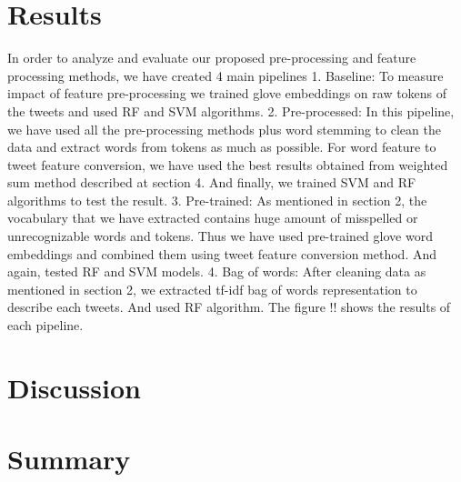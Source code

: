 \documentclass[10pt,conference,compsocconf]{IEEEtran}
\begin{document}



\section{Results}
\label{S4}
In order to analyze and evaluate our proposed pre-processing and feature processing methods, we have created 4 main pipelines
1. Baseline: 
	To measure impact of feature pre-processing we trained glove embeddings on raw tokens of the tweets and used RF and SVM algorithms.
2. Pre-processed:
	In this pipeline, we have used all the pre-processing methods plus word stemming to clean the data and extract words from tokens as much as possible. For word feature to tweet feature conversion, we have used the best results obtained from weighted sum method described at section 4. And finally, we trained SVM and RF algorithms to test the result.
3. Pre-trained:
	As mentioned in section 2, the vocabulary that we have extracted contains huge amount of misspelled or unrecognizable words and tokens. Thus we have used pre-trained glove word embeddings and combined them using tweet feature conversion method. And again, tested RF and SVM models.
4. Bag of words:
	After cleaning data as mentioned in section 2, we extracted tf-idf bag of words representation to describe each tweets. And used RF algorithm.
The figure !! shows the results of each pipeline. 


\section{Discussion}
\label{S5}

\section{Summary}
\label{S6}



\end{document}
